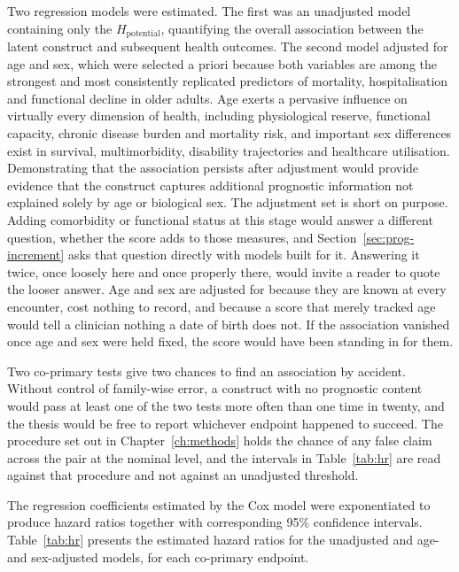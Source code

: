 Two regression models were estimated. The first was an unadjusted model containing only the $H_{\text{potential}}$, quantifying the overall association between the latent construct and subsequent health outcomes. The second model adjusted for age and sex, which were selected a priori because both variables are among the strongest and most consistently replicated predictors of mortality, hospitalisation and functional decline in older adults. Age exerts a pervasive influence on virtually every dimension of health, including physiological reserve, functional capacity, chronic disease burden and mortality risk, and important sex differences exist in survival, multimorbidity, disability trajectories and healthcare utilisation. Demonstrating that the association persists after adjustment would provide evidence that the construct captures additional prognostic information not explained solely by age or biological sex. The adjustment set is short on purpose. Adding comorbidity or functional status at this stage would answer a different question, whether the score adds to those measures, and Section~\ref{sec:prog-increment} asks that question directly with models built for it. Answering it twice, once loosely here and once properly there, would invite a reader to quote the looser answer. Age and sex are adjusted for because they are known at every encounter, cost nothing to record, and because a score that merely tracked age would tell a clinician nothing a date of birth does not. If the association vanished once age and sex were held fixed, the score would have been standing in for them.

Two co-primary tests give two chances to find an association by accident. Without control of family-wise error, a construct with no prognostic content would pass at least one of the two tests more often than one time in twenty, and the thesis would be free to report whichever endpoint happened to succeed. The procedure set out in Chapter~\ref{ch:methods} holds the chance of any false claim across the pair at the nominal level, and the intervals in Table~\ref{tab:hr} are read against that procedure and not against an unadjusted threshold.

The regression coefficients estimated by the Cox model were exponentiated to produce hazard ratios together with corresponding 95\% confidence intervals. Table~\ref{tab:hr} presents the estimated hazard ratios for the unadjusted and age- and sex-adjusted models, for each co-primary endpoint.

